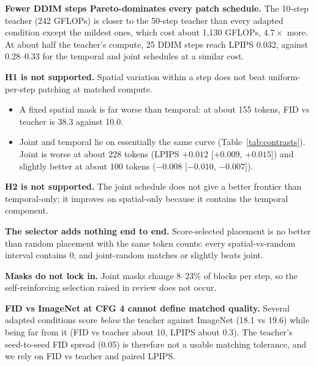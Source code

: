 \textbf{Fewer DDIM steps Pareto-dominates every patch schedule.} The 10-step teacher (242 GFLOPs) is closer to the 50-step teacher than
every adapted condition except the mildest ones, which cost about 1,130 GFLOPs, $4.7\times$ more. At about half the teacher's compute,
25 DDIM steps reach LPIPS 0.032, against 0.28--0.33 for the temporal and joint schedules at a similar cost.

\textbf{H1 is not supported.} Spatial variation within a step does not beat uniform-per-step patching at matched compute.
\begin{itemize}
  \item A fixed spatial mask is far worse than temporal: at about 155 tokens, FID vs teacher is 38.3 against 10.0.
  \item Joint and temporal lie on essentially the same curve (Table~\ref{tab:contrasts}). Joint is worse at about 228 tokens (LPIPS
  $+0.012$ [$+0.009$, $+0.015$]) and slightly better at about 100 tokens ($-0.008$ [$-0.010$, $-0.007$]).
\end{itemize}

\textbf{H2 is not supported.} The joint schedule does not give a better frontier than temporal-only; it improves on spatial-only
because it contains the temporal component.

\textbf{The selector adds nothing end to end.} Score-selected placement is no better than random placement with the same token
counts: every spatial-vs-random interval contains 0, and joint-random matches or slightly beats joint.

\textbf{Masks do not lock in.} Joint masks change 8--23\% of blocks per step, so the self-reinforcing selection raised in review does
not occur.

\textbf{FID vs ImageNet at CFG 4 cannot define matched quality.} Several adapted conditions score \emph{below} the teacher against
ImageNet (18.1 vs 19.6) while being far from it (FID vs teacher about 10, LPIPS about 0.3). The teacher's seed-to-seed FID spread
(0.05) is therefore not a usable matching tolerance, and we rely on FID vs teacher and paired LPIPS.


